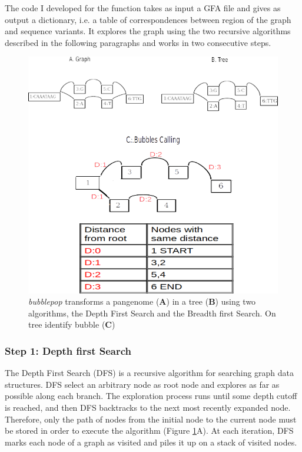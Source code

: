 The code I developed for the \bbp function takes as input a GFA file and gives as output a dictionary, i.e. a table of correspondences between region of the graph and sequence variants. It explores the graph using the two recursive algorithms described in the following paragraphs and works in two consecutive steps. 


\begin{figure}[H]
\centering
\includegraphics[width=1.00\textwidth]{fig/bubblepop.png}
\decoRule
\caption{\textit{bubblepop} transforms a pangenome (\textbf{A}) in a tree (\textbf{B}) using two algorithms, the Depth First Search and the Breadth first Search. On tree identify bubble (\textbf{C})}
\label{fig:bubblepop.png}
\end{figure}


\setcounter{secnumdepth}{3}
\subsubsection{Step 1: Depth first Search}

The Depth First Search (DFS) \cite{korf1985depth,wiki:DFS} is a recursive algorithm for searching graph data structures. DFS select an arbitrary node as root node and explores as far as possible along each branch. The exploration process runs until some depth cutoff is reached, and then DFS backtracks to the next most recently expanded node. Therefore, only the path of nodes from the initial  node to the current  node  must be stored in order to execute the algorithm (Figure \ref{fig:bubblepop.png}A). At each iteration, DFS marks each node of a graph as visited and piles it up on a stack of visited nodes. \\


